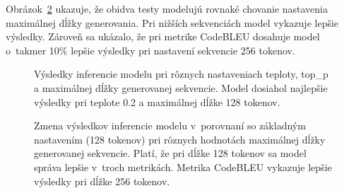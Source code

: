 Obrázok~\ref{fig:max-new-tokens} ukazuje, že obidva testy modelujú rovnaké chovanie nastavenia maximálnej dĺžky generovania. Pri nižších sekvenciách model vykazuje lepšie výsledky. Zároveň sa ukázalo, že pri metrike CodeBLEU dosahuje model o~takmer 10\% lepšie výsledky pri nastavení sekvencie 256 tokenov.

\begin{figure}
    \centering
    
    
    \caption{Výsledky inferencie modelu \MCfim{} pri rôznych nastaveniach teploty, top\_p a maximálnej dĺžky generovanej sekvencie. Model dosiahol najlepšie výsledky pri teplote 0.2 a maximálnej dĺžke 128 tokenov.}
    \label{fig:infer-test}
\end{figure}

\begin{figure}
    \centering
    
    \caption{Zmena výsledkov inferencie modelu \MCfim{} v~porovnaní so základným nastavením (128 tokenov) pri rôznych hodnotách maximálnej dĺžky generovanej sekvencie. Platí, že pri dĺžke 128 tokenov sa model správa lepšie v~troch metrikách. Metrika CodeBLEU vykazuje lepšie výsledky pri dĺžke 256 tokenov.}
    \label{fig:max-new-tokens}
\end{figure}